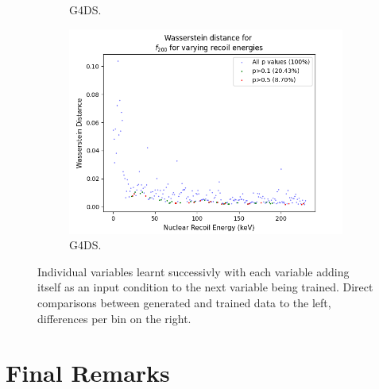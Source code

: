 \documentclass[11pt]{article} %
\begin{document}
\begin{figure}[H]
\begin{minipage}{\textwidth}
\begin{subfigure}{.5\textwidth}
      \caption{G4DS.}
  \end{subfigure}
\end{minipage}
\begin{minipage}{\textwidth}
  \centering
  \begin{subfigure}{.5\textwidth}
      \centering\captionsetup{width=.8\linewidth}%
      \includegraphics[scale=0.5]{./images/wasserstein_distance_f200like.png}
      \caption{G4DS.}
  \end{subfigure}
\end{minipage}
\caption{Individual variables learnt successivly with each variable adding itself as an input condition
to the next variable being trained. Direct comparisons between generated and trained data to the left, differences per bin on the right.}
\label{fig:wass_distance}
\end{figure}
\section{Final Remarks}

\newpage
\printbibliography
\end{document}

